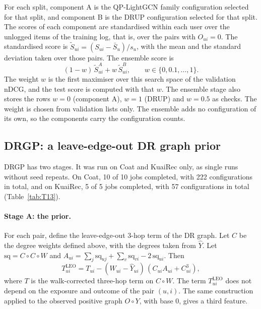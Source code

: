 For each split, component A is the QP-LightGCN family configuration selected for that split, and component B is
the DRUP configuration selected for that split. The scores of each component are standardised within each user
over the unlogged items of the training log, that is, over the pairs with $O_{ui}=0$. The standardised score
is $\tilde S_{ui}=(S_{ui}-\bar S_u)/s_u$, with the mean and the standard deviation taken over those pairs. The
ensemble score is
\begin{equation*}
(1-w)\,\tilde S^{A}_{ui}+w\,\tilde S^{B}_{ui},\qquad w\in\{0,0.1,\dots,1\}.
\end{equation*}
The weight $w$ is the first maximiser over this search space of the validation nDCG, and the test score is computed with
that $w$. The ensemble stage also stores the rows $w=0$ (component A), $w=1$ (DRUP) and $w=0.5$ as checks. The
weight is chosen from validation lists only. The ensemble adds no configuration of its own, so the components
carry the configuration counts.

\subsection{DRGP: a leave-edge-out DR graph prior}\label{sec:drgp}

DRGP has two stages. It was run on Coat and KuaiRec only, as single runs without seed repeats. On Coat, 10 of 10
jobs completed, with 222 configurations in total, and on KuaiRec, 5 of 5 jobs completed, with 57 configurations in
total (Table~\ref{tab:T13}).

\paragraph{Stage A: the prior.}
For each pair, define the leave-edge-out 3-hop term of the DR graph. Let $C$ be the degree weights defined above, with the degrees taken from $\hat Y$. Let $\mathrm{sq}=C\circ C\circ W$ and
$A_{ui}=\sum_j\mathrm{sq}_{uj}+\sum_v\mathrm{sq}_{vi}-2\,\mathrm{sq}_{ui}$. Then
\begin{equation*}
T^{\mathrm{LEO}}_{ui}=T_{ui}-(W_{ui}-\hat Y_{ui})\,(C_{ui}A_{ui}+C_{ui}^3),
\end{equation*}
where $T$ is the walk-corrected three-hop term on $C\circ W$. The term $T^{\mathrm{LEO}}_{ui}$ does not depend on
the exposure and outcome of the pair $(u,i)$. The same construction applied to the observed positive graph
$O\circ Y$, with base 0, gives a third feature.

